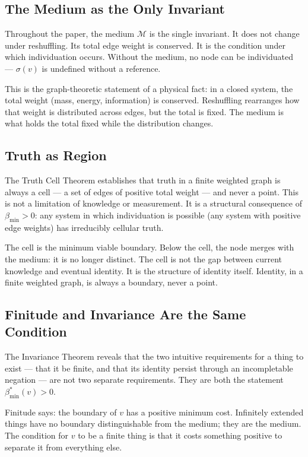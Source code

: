 \documentclass[11pt,twocolumn,a4paper]{article}
\theoremstyle{plain}
\theoremstyle{definition}
\theoremstyle{remark}
\newcommand{\med}{\mathcal{M}}
\newcommand{\bmin}{\beta_{\min}}
\begin{document}
\subsection{The Medium as the Only Invariant}

Throughout the paper, the medium $\med$ is the single invariant. It does not
change under reshuffling. Its total edge weight is conserved. It is the
condition under which individuation occurs. Without the medium, no node can
be individuated --- $\sigma(v)$ is undefined without a reference.

This is the graph-theoretic statement of a physical fact: in a closed system,
the total weight (mass, energy, information) is conserved. Reshuffling
rearranges how that weight is distributed across edges, but the total is fixed.
The medium is what holds the total fixed while the distribution changes.

\subsection{Truth as Region}

The Truth Cell Theorem establishes that truth in a finite weighted graph is
always a cell --- a set of edges of positive total weight --- and never a
point. This is not a limitation of knowledge or measurement. It is a structural
consequence of $\bmin > 0$: any system in which individuation is possible
(any system with positive edge weights) has irreducibly cellular truth.

The cell is the minimum viable boundary. Below the cell, the node merges
with the medium: it is no longer distinct. The cell is not the gap between
current knowledge and eventual identity. It is the structure of identity
itself. Identity, in a finite weighted graph, is always a boundary, never
a point.

\subsection{Finitude and Invariance Are the Same Condition}

The Invariance Theorem reveals that the two intuitive requirements for a thing
to exist --- that it be finite, and that its identity persist through an
incompletable negation --- are not two separate requirements. They are both
the statement $\bmin^*(v) > 0$.

Finitude says: the boundary of $v$ has a positive minimum cost. Infinitely
extended things have no boundary distinguishable from the medium; they are
the medium. The condition for $v$ to be a finite thing is that it costs
something positive to separate it from everything else.
\end{document}
